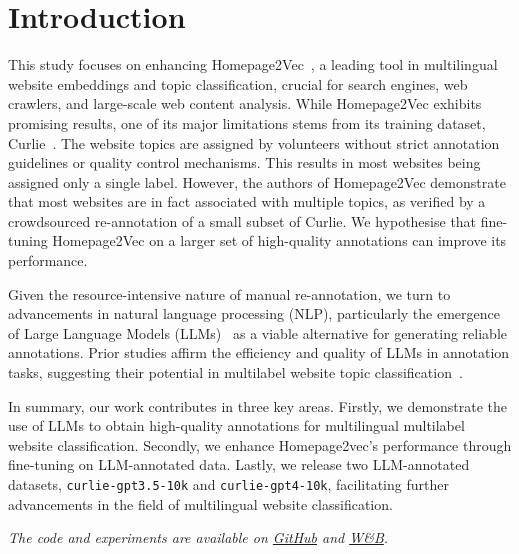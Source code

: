 \section{Introduction}

This study focuses on enhancing Homepage2Vec~\cite{homepage2vec}, a leading tool in multilingual website embeddings and topic classification, crucial for search engines, web crawlers, and large-scale web content analysis. While Homepage2Vec exhibits promising results, one of its major limitations stems from its training dataset, Curlie~\cite{curlie}. The website topics are assigned by volunteers without strict annotation guidelines or quality control mechanisms. This results in most websites being assigned only a single label. However, the authors of Homepage2Vec demonstrate that most websites are in fact associated with multiple topics, as verified by a crowdsourced re-annotation of a small subset of Curlie. We hypothesise that fine-tuning Homepage2Vec on a larger set of high-quality annotations can improve its performance.

Given the resource-intensive nature of manual re-annotation, we turn to advancements in natural language processing (NLP), particularly the emergence of Large Language Models (LLMs)~\cite{gpt3, gpt4} as a viable alternative for generating reliable annotations. Prior studies affirm the efficiency and quality of LLMs in annotation tasks, suggesting their potential in multilabel website topic classification~\cite{is-gpt3-good-annot,prompt-tuning,annollm,reduce-labeling-cost}.

In summary, our work contributes in three key areas. Firstly, we demonstrate the use of LLMs to obtain high-quality annotations for multilingual multilabel website classification. Secondly, we enhance Homepage2vec's performance through fine-tuning on LLM-annotated data. Lastly, we release two LLM-annotated datasets, \texttt{curlie-gpt3.5-10k} and \texttt{curlie-gpt4-10k}, facilitating further advancements in the field of multilingual website classification.

\textit{The code and experiments are available on \href{https://github.com/CS-433/ml-project-2-mlp}{GitHub} and \href{https://wandb.ai/ml-project-2-mlp/homepage2vec}{W\&B}.}
